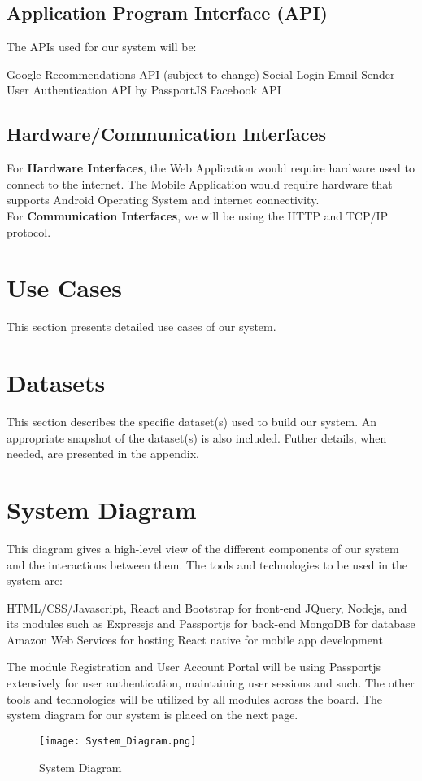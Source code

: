\subsection{Application Program Interface (API)}
The APIs used for our system will be: 
\begin{outline}
    \1 Google Recommendations API (subject to change)
    \1 Social Login
    \1 Email Sender
    \1 User Authentication API by PassportJS
    \1 Facebook API
\end{outline}

\subsection{Hardware/Communication Interfaces}
For \textbf{Hardware Interfaces}, the Web Application would require hardware used to connect to the internet. The Mobile Application would require hardware that supports Android Operating System and internet connectivity. \\ For \textbf{Communication Interfaces}, we will be using the HTTP and TCP/IP protocol.

\section{Use Cases}
This section presents detailed use cases of our system.

\section{Datasets}
This section describes the specific dataset(s) used to build our system. An appropriate snapshot of the dataset(s) is also included. Futher details, when needed, are presented in the appendix.

\section{System Diagram}
This diagram gives a high-level view of the different components of our system and the interactions between them.
The tools and technologies to be used in the system are:
\begin{outline}
    \1 HTML/CSS/Javascript, React and Bootstrap for front-end
    \1 JQuery, Nodejs, and its modules such as Expressjs and Passportjs for back-end
    \1 MongoDB for database
    \1 Amazon Web Services for hosting
    \1 React native for mobile app development
\end{outline}
The module Registration and User Account Portal will be using Passportjs extensively for user authentication, maintaining user sessions and such. The other tools and technologies will be utilized by all modules across the board.
    The system diagram for our system is placed on the next page.

\begin{figure}
  \caption{System Diagram}
  \texttt{[image: System\_Diagram.png]}
  \centering
\end{figure}